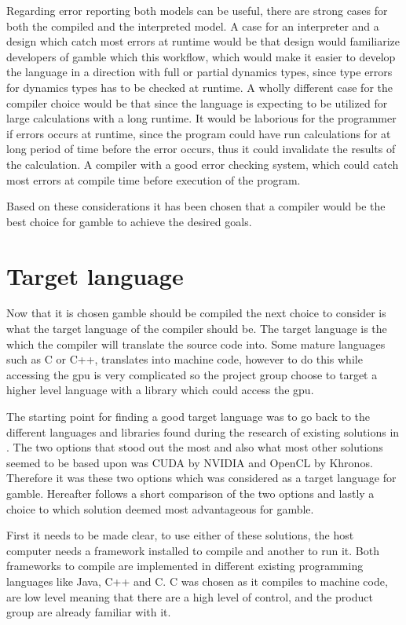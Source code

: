 Regarding error reporting both models can be useful, there are strong cases for both the compiled and the interpreted model.
A case for an interpreter and a design which catch most errors at runtime would be that design would familiarize developers of \gls{gamble} which this workflow, which would make it easier to develop the language in a direction with full or partial dynamics types, since type errors for dynamics types has to be checked at runtime.
A wholly different case for the compiler choice would be that since the language is expecting to be utilized for large calculations with a long runtime.
It would be laborious for the programmer if errors occurs at runtime, since the program could have run calculations for at long period of time before the error occurs, thus it could invalidate the results of the calculation.
A compiler with a good error checking system, which could catch most errors at compile time before execution of the program. \citep{Sebesta, Crafting_book}

Based on these considerations it has been chosen that a compiler would be the best choice for \gls{gamble} to achieve the desired goals.

\section{Target language}
Now that it is chosen \gls{gamble} should be compiled the next choice to consider is what the target language of the compiler should be.
The target language is the which the compiler will translate the source code into.
Some mature languages such as C or C++, translates into machine code, however to do this while accessing the \gls{gpu} is very complicated so the project group choose to target a higher level language with a library which could access the \gls{gpu}.

The starting point for finding a good target language was to go back to the different languages and libraries found during the research of existing solutions in .
The two options that stood out the most and also what most other solutions seemed to be based upon was CUDA by NVIDIA and OpenCL by Khronos.
Therefore it was these two options which was considered as a target language for \gls{gamble}.
Hereafter follows a short comparison of the two options and lastly a choice to which solution deemed most advantageous for \gls{gamble}.

First it needs to be made clear, to use either of these solutions, the host computer needs a framework installed to compile and another to run it. 
Both frameworks to compile are implemented in different existing programming languages like Java, C++ and C.
C was chosen as it compiles to machine code, are low level meaning that there are a high level of control, and the product group are already familiar with it. 

